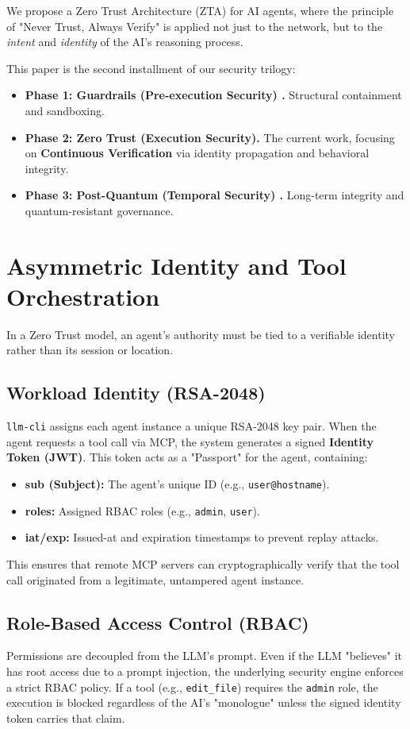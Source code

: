 \documentclass[conference]{IEEEtran}
\begin{document}
We propose a Zero Trust Architecture (ZTA) for AI agents, where the principle of "Never Trust, Always Verify" is applied not just to the network, but to the \textit{intent} and \textit{identity} of the AI's reasoning process.

This paper is the second installment of our security trilogy:
\begin{itemize}
    \item \textbf{Phase 1: Guardrails (Pre-execution Security) \cite{ando2026guardrails}.} Structural containment and sandboxing.
    \item \textbf{Phase 2: Zero Trust (Execution Security).} The current work, focusing on \textbf{Continuous Verification} via identity propagation and behavioral integrity.
    \item \textbf{Phase 3: Post-Quantum (Temporal Security) \cite{ando2026pqc}.} Long-term integrity and quantum-resistant governance.
\end{itemize}

\section{Asymmetric Identity and Tool Orchestration}
In a Zero Trust model, an agent's authority must be tied to a verifiable identity rather than its session or location.

\subsection{Workload Identity (RSA-2048)}
\texttt{llm-cli} assigns each agent instance a unique RSA-2048 key pair. When the agent requests a tool call via MCP, the system generates a signed \textbf{Identity Token (JWT)}. This token acts as a "Passport" for the agent, containing:
\begin{itemize}
    \item \textbf{sub (Subject):} The agent's unique ID (e.g., \texttt{user@hostname}).
    \item \textbf{roles:} Assigned RBAC roles (e.g., \texttt{admin}, \texttt{user}).
    \item \textbf{iat/exp:} Issued-at and expiration timestamps to prevent replay attacks.
\end{itemize}
This ensures that remote MCP servers can cryptographically verify that the tool call originated from a legitimate, untampered agent instance.

\subsection{Role-Based Access Control (RBAC)}
Permissions are decoupled from the LLM's prompt. Even if the LLM "believes" it has root access due to a prompt injection, the underlying security engine enforces a strict RBAC policy. If a tool (e.g., \texttt{edit\_file}) requires the \texttt{admin} role, the execution is blocked regardless of the AI's "monologue" unless the signed identity token carries that claim.
\end{document}
